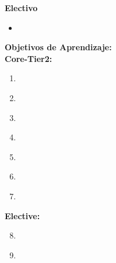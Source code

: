 \noindent \textbf{Electivo}
\begin{itemize}
	\item \SESoftwareConstructionTopicPotential\label{sec:BOK:SESoftwareConstructionTopicPotential}
\end{itemize}


\noindent \textbf{Objetivos de Aprendizaje:}\\
\noindent \textbf{Core-Tier2:}
\begin{enumerate}
	\setcounter{enumi}{0}
	\item \SESoftwareConstructionLODescribeTechniques\xspace[\SESoftwareConstructionLODescribeTechniquesLevel]\label{sec:BOK:SESoftwareConstructionLODescribeTechniques}
	\item \SESoftwareConstructionLOBuild\xspace[\SESoftwareConstructionLOBuildLevel]\label{sec:BOK:SESoftwareConstructionLOBuild}
	\item \SESoftwareConstructionLODescribeSecure\xspace[\SESoftwareConstructionLODescribeSecureLevel]\label{sec:BOK:SESoftwareConstructionLODescribeSecure}
	\item \SESoftwareConstructionLOSelectAndDefined\xspace[\SESoftwareConstructionLOSelectAndDefinedLevel]\label{sec:BOK:SESoftwareConstructionLOSelectAndDefined}
	\item \SESoftwareConstructionLOCompareAndStrategies\xspace[\SESoftwareConstructionLOCompareAndStrategiesLevel]\label{sec:BOK:SESoftwareConstructionLOCompareAndStrategies}
	\item \SESoftwareConstructionLODescribeTheAnalyzing\xspace[\SESoftwareConstructionLODescribeTheAnalyzingLevel]\label{sec:BOK:SESoftwareConstructionLODescribeTheAnalyzing}
	\item \SESoftwareConstructionLODescribeTheAnalyzingChanges\xspace[\SESoftwareConstructionLODescribeTheAnalyzingChangesLevel]\label{sec:BOK:SESoftwareConstructionLODescribeTheAnalyzingChanges}
\end{enumerate}
\noindent \textbf{Elective:}
\begin{enumerate}
	\setcounter{enumi}{7}
	\item \SESoftwareConstructionLORewrite\xspace[\SESoftwareConstructionLORewriteLevel]\label{sec:BOK:SESoftwareConstructionLORewrite}
	\item \SESoftwareConstructionLOWriteAThatNon\xspace[\SESoftwareConstructionLOWriteAThatNonLevel]\label{sec:BOK:SESoftwareConstructionLOWriteAThatNon}
\end{enumerate}


